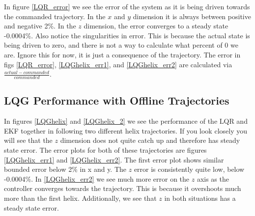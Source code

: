 \documentclass[conf]{new-aiaa}
\begin{document}
\begin{doublespace}
\begin{singlespace}
In figure \ref{LQR_error} we see the error of the system as it is being driven towards the commanded trajectory. In the $x$ and $y$ dimension it is always between positive and negative 2\%. In the $z$ dimension, the error converges to a steady state -0.0004\%. Also notice the singularities in error. This is because the actual state is being driven to zero, and there is not a way to calculate what percent of 0 we are. Ignore this for now, it is just a consequence of the trajectory. The error in figs \ref{LQR_error}, \ref{LQGhelix_err1}, and \ref{LQGhelix_err2} are calculated via $\frac{actual-commanded}{commanded}$.

\subsection{LQG Performance with Offline Trajectories}
In figures \ref{LQGhelix} and \ref{LQGhelix_2} we see the performance of the LQR and EKF together in following two different helix trajectories. If you look closely you will see that the $z$ dimension does not quite catch up and therefore has steady state error. The error plots for both of these trajectories are figures \ref{LQGhelix_err1} and \ref{LQGhelix_err2}. The first error plot shows similar bounded error below 2\% in x and y. The $z$ error is consistently quite low, below -0.0004\%. In \ref{LQGhelix_err2} we see much more error on the $z$ axis as the controller converges towards the trajectory. This is because it overshoots much more than the first helix. Additionally, we see that $z$ in both situations has a steady state error.


\end{singlespace}
\end{doublespace}
\end{document}
